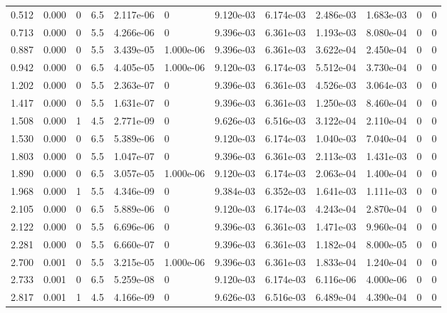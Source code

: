 \documentclass[preview]{standalone}
\begin{document}
{{\begin{tabular}{L{1.2cm}C{1.2cm} C{0.3cm}C{0.5cm} C{1.4cm}C{1.4cm} C{1.4cm}C{1.4cm} C{1.6cm}C{1.6cm} C{1.6cm}C{1.6cm}}
  0.512  &  0.000  & 0     & 6.5 &  2.117e-06  & 0  &  9.120e-03&   6.174e-03& 2.486e-03 & 1.683e-03   &  0 & 0  \\ 
  0.713  &  0.000  & 0     & 5.5 &  4.266e-06  & 0  &  9.396e-03&   6.361e-03& 1.193e-03 & 8.080e-04   &  0 & 0  \\ 
  0.887  &  0.000  & 0     & 5.5 &  3.439e-05  & 1.000e-06  &  9.396e-03&   6.361e-03& 3.622e-04 & 2.450e-04   &  0 & 0  \\ 
  0.942  &  0.000  & 0     & 6.5 &  4.405e-05  & 1.000e-06  &  9.120e-03&   6.174e-03& 5.512e-04 & 3.730e-04   &  0 & 0  \\ 
  1.202  &  0.000  & 0     & 5.5 &  2.363e-07  & 0  &  9.396e-03&   6.361e-03& 4.526e-03 & 3.064e-03   &  0 & 0  \\ 
  1.417  &  0.000  & 0     & 5.5 &  1.631e-07  & 0  &  9.396e-03&   6.361e-03& 1.250e-03 & 8.460e-04   &  0 & 0  \\ 
  1.508  &  0.000  & 1     & 4.5 &  2.771e-09  & 0  &  9.626e-03&   6.516e-03& 3.122e-04 & 2.110e-04   &  0 & 0  \\ 
  1.530  &  0.000  & 0     & 6.5 &  5.389e-06  & 0  &  9.120e-03&   6.174e-03& 1.040e-03 & 7.040e-04   &  0 & 0  \\ 
  1.803  &  0.000  & 0     & 5.5 &  1.047e-07  & 0  &  9.396e-03&   6.361e-03& 2.113e-03 & 1.431e-03   &  0 & 0  \\ 
  1.890  &  0.000  & 0     & 6.5 &  3.057e-05  & 1.000e-06  &  9.120e-03&   6.174e-03& 2.063e-04 & 1.400e-04   &  0 & 0  \\ 
  1.968  &  0.000  & 1     & 5.5 &  4.346e-09  & 0  &  9.384e-03&   6.352e-03& 1.641e-03 & 1.111e-03   &  0 & 0  \\ 
  2.105  &  0.000  & 0     & 6.5 &  5.889e-06  & 0  &  9.120e-03&   6.174e-03& 4.243e-04 & 2.870e-04   &  0 & 0  \\ 
  2.122  &  0.000  & 0     & 5.5 &  6.696e-06  & 0  &  9.396e-03&   6.361e-03& 1.471e-03 & 9.960e-04   &  0 & 0  \\ 
  2.281  &  0.000  & 0     & 5.5 &  6.660e-07  & 0  &  9.396e-03&   6.361e-03& 1.182e-04 & 8.000e-05   &  0 & 0  \\ 
  2.700  &  0.001  & 0     & 5.5 &  3.215e-05  & 1.000e-06  &  9.396e-03&   6.361e-03& 1.833e-04 & 1.240e-04   &  0 & 0  \\ 
  2.733  &  0.001  & 0     & 6.5 &  5.259e-08  & 0  &  9.120e-03&   6.174e-03& 6.116e-06 & 4.000e-06   &  0 & 0  \\ 
  2.817  &  0.001  & 1     & 4.5 &  4.166e-09  & 0  &  9.626e-03&   6.516e-03& 6.489e-04 & 4.390e-04   &  0 & 0  \\ 

\end{tabular}}}
\end{document}

